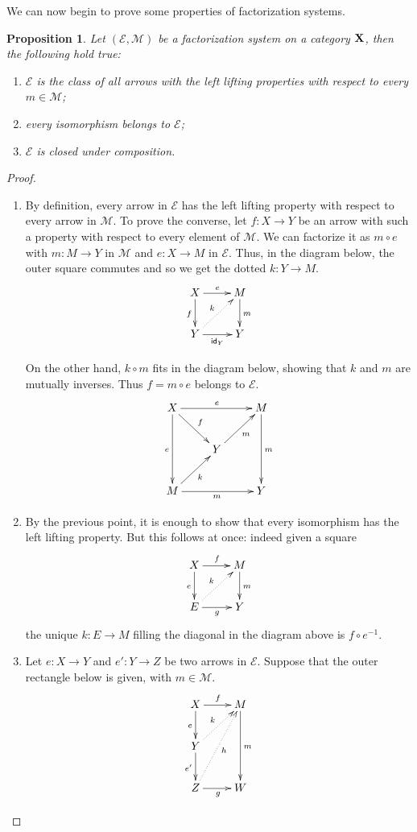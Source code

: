 \documentclass[a4paper]{article}
\newcommand{\id}[1]{\mathsf{id}_{#1}}
\def\X{\textbf {\textup{X}}}
\def\Y{\textbf {\textup{Y}}}
\def\Z{\textbf {\textup{Z}}}
\def\E{\textbf {\textup{E}}}
\newtheorem{proposition}[theorem]{Proposition}
\theoremstyle{definition}
\begin{document}
We can now begin to prove some properties of factorization systems.

\begin{proposition}\label{prop:el}
Let $(\mathcal{E}, \mathcal{M})$ be a factorization system on a category $\X$, then the following hold true:
\begin{enumerate}
	\item $\mathcal{E}$ is the class of all arrows with the left lifting properties with respect to every $m\in \mathcal{M}$;
	\item every isomorphism belongs to $\mathcal{E}$;
	\item $\mathcal{E}$ is closed under composition.
\end{enumerate}
\end{proposition}
\begin{proof}
	\begin{enumerate}
		\item By definition, every arrow in $\mathcal{E}$ has the left lifting property with respect to every arrow in $\mathcal{M}$. To prove the converse, let $f\colon X\to Y$ be an arrow with such a property with respect to every element of $\mathcal{M}$.  We can factorize it as $m\circ e$ with $m\colon M\to Y$ in $\mathcal{M}$ and $e\colon X\to M$ in $\mathcal{E}$. Thus, in the diagram below, the outer square commutes and so we get the dotted $k\colon Y\to M$.
		\[\xymatrix{X\ar[d]_f\ar[r]^e & M\ar[d]^{m}\\Y\ar[r]_{\id{Y}} \ar@{.>}[ur]^{k} & Y}\]
		
		On the other hand, $k\circ m$ fits in the diagram below, showing that $k$ and $m$ are mutually inverses. Thus $f=m\circ e$ belongs to $\mathcal{E}$.
		\[\xymatrix{X\ar[rr]^{e} \ar[dd]_{e} \ar[dr]^{f}&& M\ar[dd]^{m} \ar@{<-}[dl]^{m}\\& Y\ar@{<-}[dl]^{k}\\M \ar[rr]_{m}&&Y}\]
		\item By the previous point, it is enough to show that every isomorphism has the left lifting property. But this follows at once: indeed given a square
				\[\xymatrix{X\ar[d]_e\ar[r]^f & M\ar[d]^{m}\\E\ar[r]_{g} \ar@{.>}[ur]^{k} & Y}\]
	the unique $k\colon E\to M$ filling the diagonal in the diagram above is $f\circ e^{-1}$.
		
		\item Let $e\colon X\to Y$ and $e'\colon Y\to Z$ be two arrows in $\mathcal{E}$. Suppose that the outer rectangle below is given, with $m\in \mathcal{M}$.
		\[\xymatrix{X  \ar[r]^f \ar[d]_{e}& M \ar[dd]^{m}\\Y \ar@{.>}[ur]^{k} \ar[d]_{e'}\\Z \ar@{.>}[uur]_{h}\ar[r]_{g}& W}\]
		

\end{enumerate}
\end{proof}
\end{document}
